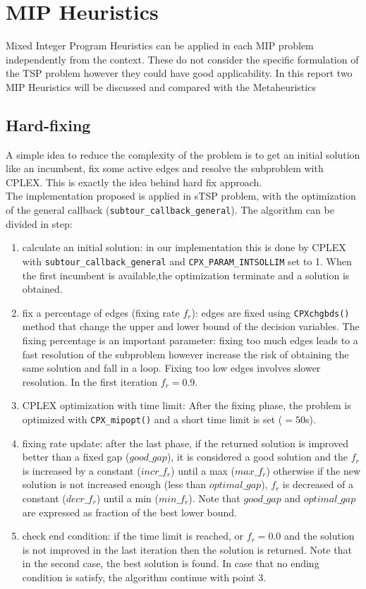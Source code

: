 \chapter{MIP Heuristics}
Mixed Integer Program Heuristics can be applied in each MIP problem independently from the context. These do not consider the specific formulation of the TSP problem however they could have good applicability. In this report two MIP Heuristics will be discussed and compared with the  Metaheuristics

\section{Hard-fixing}
A simple idea to reduce the complexity of the problem is to get an initial solution like an incumbent, fix some active edges and resolve the subproblem with CPLEX. This is exactly the idea behind hard fix approach.\\
The implementation proposed is applied in sTSP problem, with the optimization of the general callback (\texttt{subtour\_callback\_general}).
The algorithm can be divided in step:
\begin{enumerate} \label{hard-fix-step}
	\item calculate an initial solution: in our implementation this is done by CPLEX with \texttt{subtour\_callback\_general} and \texttt{CPX\_PARAM\_INTSOLLIM} set to 1. When the first incumbent is available,the optimization terminate and a solution is obtained.
	\item fix a percentage of edges (fixing rate $ f_r $): edges are fixed using \texttt{CPXchgbds()} method that change the upper and lower bound of the decision variables. The fixing percentage is an important parameter: fixing too much edges leads to a fast resolution of the subproblem however increase the risk of obtaining the same solution and fall in a loop. Fixing too low edges involves slower resolution. In the first iteration $ f_r = 0.9 $.
	\item CPLEX optimization with time limit: After the fixing phase, the problem is optimized with \texttt{CPX\_mipopt()} and a short time limit is set ($ = 50 $s).
	\item fixing rate update: after the last phase, if the returned solution is improved better than a fixed gap ($  good\_gap $), it is considered a good solution and the $ f_r $ is increased by a constant ($ incr\_f_r $) until a max ($ max\_f_r $) otherwise if the new solution is not increased enough (less than $ optimal\_gap $), $ f_r $ is decreased of a constant ($ decr\_f_r $) until a min ($ min\_f_r $). Note that $ good\_gap $ and $ optimal\_gap $ are expressed as fraction of the best lower bound.
	\item check end condition: if the time limit is reached, or $ f_r = 0.0 $ and the solution is not improved in the last iteration then the solution is returned. Note that in the second case, the best solution is found. In case that no ending condition is satisfy, the algorithm continue with point 3.
\end{enumerate}

